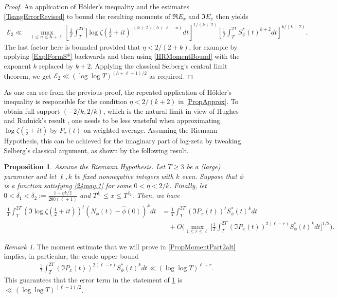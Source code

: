 \documentclass[12pt,oneside,english,a4paper]{amsart}
\newtheorem{prop}[thm]{Proposition}
\theoremstyle{remark}
\newtheorem{rem}[thm]{Remark}
\numberwithin{equation}{section}
\newcommand{\Starphi}{S_\phi^*}
\begin{document}
\begin{proof}
        An application of H\"older's inequality and the estimates \eqref{TsangErrorRevised} to bound the resulting moments of $\Re E_x$ and $\Im E_x$ then yields
        \begin{align*}
        \mathcal E_2 
        \ll &\max_{1\leq n \leq h+\ell} \left[ \frac{1}{T} \int_T^{2 T} |\log\zeta( \tfrac12+it)|^{(k+2)(h+\ell-n)} dt \right]^{1/(k+2)}  \left[ \frac{1}{T} \int_T^{2 T} \Starphi(t)^{k+2} dt \right]^{k/(k+2)}.
    \end{align*}
    The last factor here is bounded provided that $\eta<2/(2+k)$, for example by applying \eqref{ExplFormS*} backwards and then using \eqref{HRMomentBound} with the exponent $k$ replaced by $k+2$.
    Applying the classical Selberg's central limit theorem, we get $\mathcal E_2 \ll (\log\log T)^{(h+\ell-1)/2}$ as required.
\end{proof}

As one can see from the previous proof, the repeated application of H\"older's inequality is responsible for the condition $\eta<2/(k+2)$ in \cref{PropApprox}. To obtain full support $(-2/k,2/k)$, which is the natural limit in view of Hughes and Rudnick's result \cite{HughesRudnick}, one needs to be less wasteful when approximating $\log\zeta(\frac12+it)$ by $P_x(t)$ on weighted average. Assuming the Riemann Hypothesis, this can be achieved for the imaginary part of log-zeta by tweaking Selberg's classical argument, as shown by the following result. 

\begin{prop}\label{PropApproxUnderthe Riemann Hypothesis}
    Assume the Riemann Hypothesis. 
    Let $T \ge 3$ be a (large) parameter and let $\ell,k$ be fixed nonnegative integers with $k$ even. Suppose that $\phi$ is a function satisfying \eqref{24may.1} for some $0<\eta<2/k$. Finally, let $0 < \delta_1 < \delta_2 := \frac{1 - \eta k/2}{200 (\ell + 1)}$ and $T^{\delta_1} \le x \le T^{\delta_2}$. Then, we have
    \begin{align*}
        \frac{1}{T} \int_T^{2T} (\Im\log\zeta(\tfrac{1}{2}+it))^\ell (N_\phi(t)-\hat\phi(0))^k dt 
        &= \frac{1}{T}\int_T^{2T} (\Im P_x(t))^\ell \Starphi(t)^k dt \\
        &\quad+O \bigg( \max_{1\leq r\leq \ell} \bigg[\frac{1}{T}\int_T^{2T} (\Im P_x(t))^{2(\ell-r)} \Starphi(t)^k dt\bigg]^{1/2} \bigg).
    \end{align*}
\end{prop}

\begin{rem}\label{Remark_relativeerror}
    The moment estimate that we will prove in \cref{PropMomentPart2alt} implies, in particular, the crude upper bound
    \begin{align*}
        \frac{1}{T}\int_T^{2T} (\Im P_x(t))^{2(\ell-r)} \Starphi(t)^k dt \ll (\log\log T)^{\ell-r}.
    \end{align*}
    This guarantees that the error term in the statement of \cref{PropApproxUnderthe Riemann Hypothesis} is $\ll (\log\log T)^{(\ell-1)/2}$.
\end{rem}
\end{document}
